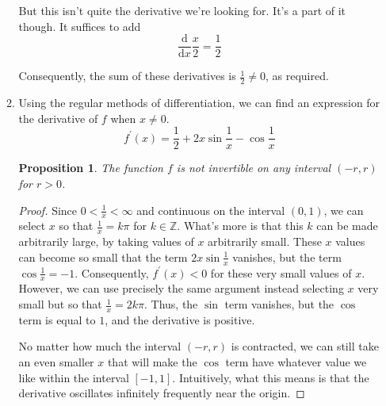 \documentclass[letterpaper,11pt]{article}
\newtheorem{prop}{Proposition}
\newcommand{\Z}{\mathbb{Z}}
\renewcommand{\d}[1]{\frac{\mathrm{d}}{\mathrm{d}#1}}
\begin{document}
\begin{enumerate}
\begin{enumerate}
                But this isn't quite the derivative we're looking for. It's a
                part of it though. It suffices to add
                \begin{equation*}
                    \d{x} \frac{x}{2} = \frac{1}{2}
                \end{equation*}

                Consequently, the sum of these derivatives is
                $\frac{1}{2} \neq 0$, as required.

            \item
                Using the regular methods of differentiation, we can find an
                expression for the derivative of $f$ when $x \neq 0$.
                \begin{equation*}
                    f^\prime(x)
                        = \frac{1}{2} + 2x\sin{\frac{1}{x}} - \cos{\frac{1}{x}}
                \end{equation*}

                \begin{prop}
                    The function $f$ is not invertible on any interval
                    $(-r, r)$ for $r > 0$.
                \end{prop}

                \begin{proof}
                    Since $0 < \frac{1}{x} < \infty$ and continuous on
                    the interval $(0, 1)$, we can select $x$ so that
                    $\frac{1}{x} = k\pi$ for $k \in \Z$. What's more is that
                    this $k$ can be made arbitrarily large, by taking values of
                    $x$ arbitrarily small. These $x$ values can become so small
                    that the term $2x\sin{\frac{1}{x}}$ vanishes, but the term
                    $\cos{\frac{1}{x}} = -1$. Consequently, $f^\prime(x) < 0$
                    for these very small values of $x$. However, we can use
                    precisely the same argument instead selecting $x$ very
                    small but so that $\frac{1}{x} = 2k\pi$. Thus, the $\sin{}$
                    term vanishes, but the $\cos{}$ term is equal to $1$, and
                    the derivative is positive.

                    No matter how much the interval $(-r, r)$ is contracted, we
                    can still take an even smaller $x$ that will make the
                    $\cos{}$ term have whatever value we like within the
                    interval $[-1,1]$.  Intuitively, what this means is that
                    the derivative oscillates infinitely frequently near the
                    origin.


\end{proof}
\end{enumerate}
\end{enumerate}
\end{document}
